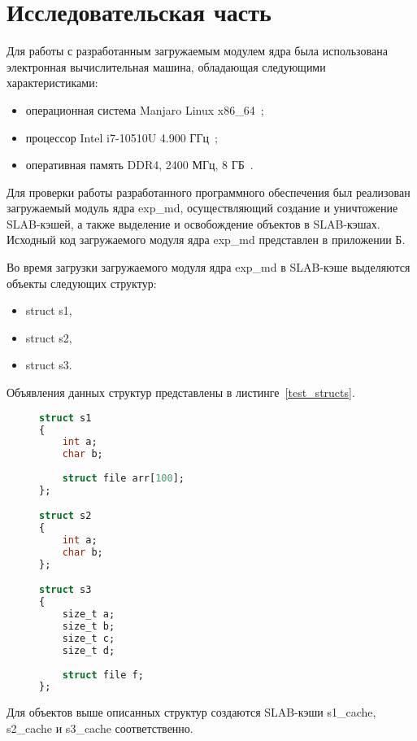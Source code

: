 \chapter{Исследовательская часть}

Для работы с разработанным загружаемым модулем ядра была использована электронная вычислительная машина, обладающая следующими характеристиками:
\begin{itemize}
	\item операционная система Manjaro Linux x86\_64~\cite{manjaro};
	\item процессор Intel i7-10510U 4.900 ГГц~\cite{cpu};
	\item оперативная память DDR4, 2400 МГц, 8 ГБ~\cite{ram}.
\end{itemize}

Для проверки работы разработанного программного обеспечения был реализован загружаемый модуль ядра exp\_md, осуществляющий создание и уничтожение SLAB-кэшей, а также выделение и освобождение объектов в SLAB-кэшах.
Исходный код загружаемого модуля ядра exp\_md представлен в приложении Б.

Во время загрузки загружаемого модуля ядра exp\_md в SLAB-кэше выделяются объекты следующих структур:
\begin{itemize}
	\item struct s1,
	\item struct s2,
	\item struct s3.
\end{itemize}

Объявления данных структур представлены в листинге~\ref{test_structs}.
\begin{figure}[H]
	\begin{lstlisting}[label=test_structs,caption=Структуры для проведения проверки работы загружаемого модуля ядра для мониторинга SLAB-кэша,language=Caml]
struct s1
{
	int a;
	char b;
	
	struct file arr[100];
};

struct s2
{
	int a;
	char b;
};

struct s3
{
	size_t a;
	size_t b;
	size_t c;
	size_t d;
	
	struct file f;
};
	\end{lstlisting}
\end{figure}

Для объектов выше описанных структур создаются SLAB-кэши s1\_cache, s2\_cache и s3\_cache соответственно.

